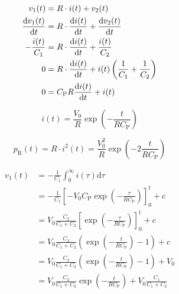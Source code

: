 \documentclass{article}[11pt]
\begin{document}
\begin{equation}
\begin{split}
v_1(t)            & =  R \cdot i(t)                   + v_2(t)                                        \\
\dv{v_1(t)}{t}    & =  R \cdot \dv{i(t)}{t}           + \dv{v_2(t)}{t}                                \\
-\frac{i(t)}{C_1} & =  R \cdot \dv{i(t)}{t}           + \frac{i(t)}{C_2}                              \\
0                 & =  R \cdot \dv{i(t)}{t}           + i(t) \left(\frac{1}{C_1}+\frac{1}{C_2}\right) \\
0                 & =  C_{\mathrm{P}} R  \dv{i(t)}{t} + i(t) 
\end{split}
\end{equation}

\begin{equation}
  i(t)= \frac{V_{\mathrm{0}}}{R} \exp\left(-\frac{t}{R C_{\mathrm{P}}}\right)
\end{equation}

\begin{equation}
  p_{\mathrm{R}}(t)= R \cdot i^2(t) = \frac{V_{\mathrm{0}}^2}{R} \exp\left(-2\frac{t}{R C_{\mathrm{P}}}\right)
\end{equation}

\begin{equation}
\begin{split}
v_{\mathrm{1}} (t) & = -\frac{1}{C_1} \int_0^{\infty} i(\tau) \mathrm{d} \tau                                                                \\
                   & = -\frac{1}{C_1} \left[-V_{\mathrm{0}} C_{\mathrm{P}} \exp\left(-\frac{\tau}{R C_{\mathrm{P}}}\right) \right]_0^{t} +c  \\
                   & = V_{\mathrm{0}} \frac{C_2}{C_1+C_2} \left[\exp\left(-\frac{\tau}{R C_{\mathrm{P}}}\right) \right]_0^{t} + c            \\
                   & = V_{\mathrm{0}} \frac{C_2}{C_1+C_2} \left(\exp\left(-\frac{t}{R C_{\mathrm{P}}}\right) -1 \right) +c                   \\
                   & = V_{\mathrm{0}} \frac{C_2}{C_1+C_2} \left(\exp\left(-\frac{t}{R C_{\mathrm{P}}}\right) -1 \right) +V_{\mathrm{0}}      \\
                   & = V_{\mathrm{0}} \frac{C_2}{C_1+C_2} \exp\left(-\frac{t}{R C_{\mathrm{P}}}\right) +V_{\mathrm{0}} \frac{C_1}{C_1+C_2}
\end{split}
\end{equation}
\end{document}
